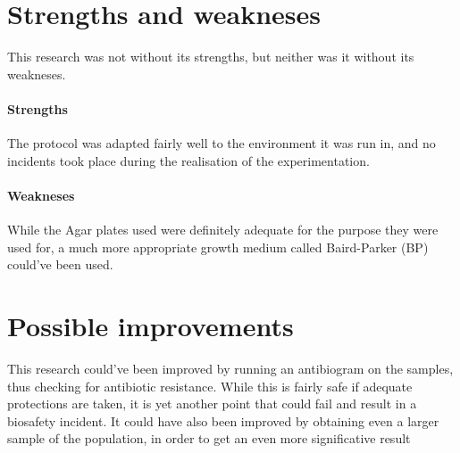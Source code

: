 \section{Strengths and weakneses}
This research was not without its strengths, but neither was it without its weakneses.
\paragraph{Strengths} The protocol was adapted fairly well to the environment it was run in, and no incidents took place during the realisation of the experimentation.
\paragraph{Weakneses} While the Agar plates used were definitely adequate for the purpose they were used for, a much more appropriate growth medium called Baird-Parker (BP) could've been used.
\section{Possible improvements}
This research could've been improved by running an antibiogram on the samples, thus checking for antibiotic resistance. While this is fairly safe if adequate protections are taken, it is yet another point that could fail and result in a biosafety incident.\newline
It could have also been improved by obtaining even a larger sample of the population, in order to get an even more significative result